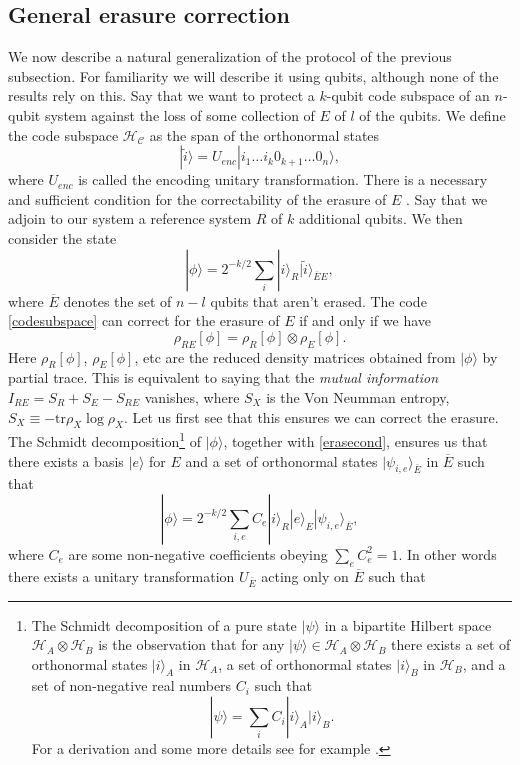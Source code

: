 \documentclass[11pt]{article}
\newcommand{\be}{\begin{equation}}
\newcommand{\ee}{\end{equation}}
\newcommand{\tr}{\mathrm{tr}}
\newcommand{\HC}{\mathcal{H}_{\mathcal{C}}}
\newcommand{\ran}{\rangle}
\newcommand{\wt}{\widetilde}
\begin{document}
\subsection{General erasure correction}\label{errcorsec}
We now describe a natural generalization of the protocol of the previous subsection. For familiarity we will describe it using qubits, although none of the results rely on this.  Say that we want to protect a $k$-qubit code subspace of an $n$-qubit system against the loss of some collection of $E$ of $l$ of the qubits.  We define the code subspace $\HC$ as the span of the orthonormal states
\be\label{codesubspace}
|\wt{i}\ran=U_{enc}|i_1 \ldots i_k 0_{k+1}\ldots 0_{n}\ran,
\ee
where $U_{enc}$ is called the encoding unitary transformation.  There is a necessary and sufficient condition for the correctability of the erasure of $E$ \cite{PhysRevA.54.2629}.  Say that we adjoin to our system a reference system $R$ of $k$ additional qubits.  We then consider the state
\be
|\phi\ran=2^{-k/2}\sum_i |i\ran_R |\wt{i}\ran_{\overline{E}E},
\ee
where $\overline{E}$ denotes the set of $n-l$ qubits that aren't erased.  The code \eqref{codesubspace} can correct for the erasure of $E$ if and only if we have
\be\label{erasecond}
\rho_{RE}[\phi]=\rho_{R}[\phi]\otimes \rho_{E}[\phi].
\ee
Here $\rho_R[\phi]$, $\rho_E[\phi]$, etc are the reduced density matrices obtained from $|\phi\ran$ by partial trace.  This is equivalent to saying that the \textit{mutual information} $I_{RE}=S_R+S_E-S_{RE}$ vanishes, where $S_X$ is the Von Neumman entropy, $S_X\equiv-\tr \rho_X \log \rho_X$.  Let us first see that this ensures we can correct the erasure.  The Schmidt decomposition\footnote{The Schmidt decomposition of a pure state $|\psi\ran$ in a bipartite Hilbert space $\mathcal{H}_A\otimes \mathcal{H}_B$ is the observation that for any $|\psi\ran\in \mathcal{H}_A\otimes \mathcal{H}_B$ there exists a set of orthonormal states $|i\ran_A$ in $\mathcal{H}_A$, a set of orthonormal states $|i\ran_B$ in $\mathcal{H}_B$, and a set of non-negative real numbers $C_i$ such that
\be
|\psi\ran=\sum_i C_i |i\ran_A |i\ran_B.
\ee
For a derivation and some more details see for example \cite{Harlow:2014yka}.} of $|\phi\ran$, together with \eqref{erasecond}, ensures us that there exists a basis $|e\ran$ for $E$ and a set of orthonormal states $|\psi_{i,e}\ran_{\overline{E}}$ in $\overline{E}$ such that
\be
|\phi\ran=2^{-k/2}\sum_{i,e}C_e|i\ran_R |e\ran_E |\psi_{i,e}\ran_{\overline{E}}, 
\ee
where $C_e$ are some non-negative coefficients obeying $\sum_e C_e^2=1$.  In other words there exists a unitary transformation $U_{\overline{E}}$ acting only on $\overline{E}$ such that
\end{document}

